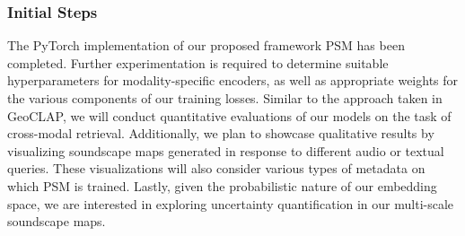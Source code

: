 \subsubsection{Initial Steps}
The PyTorch implementation of our proposed framework PSM has been completed. Further experimentation is required to determine suitable hyperparameters for modality-specific encoders, as well as appropriate weights for the various components of our training losses. Similar to the approach taken in GeoCLAP, we will conduct quantitative evaluations of our models on the task of cross-modal retrieval. Additionally, we plan to showcase qualitative results by visualizing soundscape maps generated in response to different audio or textual queries. These visualizations will also consider various types of metadata on which PSM is trained. Lastly, given the probabilistic nature of our embedding space, we are interested in exploring uncertainty quantification in our multi-scale soundscape maps.


